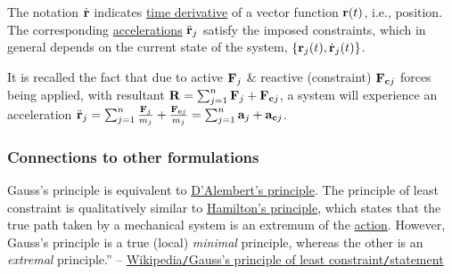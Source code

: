 \documentclass[oneside]{book}
\numberwithin{equation}{section}
\begin{document}
The notation $\dot{\bf r}$ indicates \href{https://en.wikipedia.org/wiki/Time_derivative}{time derivative} of a vector function ${\bf r}(t)$, i.e., position. The corresponding \href{https://en.wikipedia.org/wiki/Acceleration}{accelerations} $\ddot{\bf r}_j$ satisfy the imposed constraints, which in general depends on the current state of the system, $\{{\bf r}_j(t),\dot{\bf r}_j(t)\}$.

It is recalled the fact that due to active ${\bf F}_j$ \& reactive (constraint) ${\bf F}_{{\bf c}j}$ forces being applied, with resultant ${\bf R} = \sum_{j=1}^n {\bf F}_j + {\bf F}_{{\bf c}j}$, a system will experience an acceleration $\ddot{\bf r}_j = \sum_{j=1}^n \frac{{\bf F}_j}{m_j} + \frac{{\bf F}_{{\bf c}j}}{m_j} = \sum_{j=1}^n {\bf a}_j + {\bf a}_{{\bf c}j}$.

\subsubsection{Connections to other formulations}
Gauss's principle is equivalent to \href{https://en.wikipedia.org/wiki/D%27Alembert%27s_principle}{D'Alembert's principle}. The principle of least constraint is qualitatively similar to \href{https://en.wikipedia.org/wiki/Hamilton%27s_principle}{Hamilton's principle}, which states that the true path taken by a mechanical system is an extremum of the \href{https://en.wikipedia.org/wiki/Action_(physics)}{action}. However, Gauss's principle is a true (local) \textit{minimal} principle, whereas the other is an \textit{extremal} principle.'' -- \href{https://en.wikipedia.org/wiki/Gauss%27s_principle_of_least_constraint#Statement}{Wikipedia\texttt{/}Gauss's principle of least constraint\texttt{/}statement}
\end{document}
